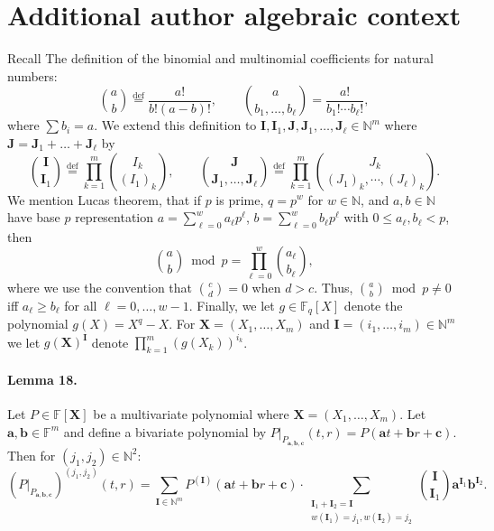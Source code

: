 \section*{Additional author algebraic context}
Recall The definition of the binomial and multinomial coefficients for natural numbers:
\[\binom ab\stackrel{\mathrm{def}}=\frac{a!}{b!(a-b)!},\qquad\binom a{b_1,\ldots,b_\ell}=\frac{a!}{b_1!\cdots b_\ell!},\]
where $\sum b_i=a$. We extend this definition to $\boldsymbol I,\boldsymbol I_1,\boldsymbol J,\boldsymbol J_1,\ldots,\boldsymbol J_\ell\in\mathbb N^m$ where $\boldsymbol J=\boldsymbol J_1+\ldots+\boldsymbol J_\ell$ by
\[\binom{\boldsymbol I}{\boldsymbol I_1}\stackrel{\mathrm{def}}=\prod_{k=1}^m\binom{I_k}{(I_1)_k},\qquad\binom{\boldsymbol J}{\boldsymbol J_1,\ldots,\boldsymbol J_\ell}\stackrel{\mathrm{def}}=\prod_{k=1}^m\binom{J_k}{(J_1)_k,\cdots,(J_\ell)_k}.\]
We mention Lucas theorem, that if $p$ is prime, $q=p^w$ for $w\in\mathbb N$, and $a,b\in\mathbb N$ have base $p$ representation $a=\sum_{\ell=0}^wa_\ell p^\ell$, $b=\sum_{\ell=0}^wb_\ell p^\ell$ with $0\leq a_\ell,b_\ell<p$, then
\[\binom ab\bmod p=\prod_{\ell=0}^w\binom{a_\ell}{b_\ell},\tag{4}\]
where we use the convention that $\binom cd=0$ when $d>c$. Thus, $\binom ab\bmod p\neq0$ iff $a_\ell\geq b_\ell$ for all $\ell=0,\ldots,w-1$.
Finally, we let $g\in\mathbb F_q[X]$ denote the polynomial $g(X)=X^q-X$. For $\boldsymbol X=(X_1,\ldots,X_m)$ and $\boldsymbol I=(i_1,\ldots,i_m)\in\mathbb N^m$ we let $g(\boldsymbol X)^{\boldsymbol I}$ denote $\prod_{k=1}^m(g(X_k))^{i_k}$.
\paragraph{Lemma 18.} Let $P\in\mathbb F[\boldsymbol X]$ be a multivariate polynomial where $\boldsymbol X=(X_1,\ldots,X_m)$. Let $\boldsymbol a,\boldsymbol b\in\mathbb F^m$ and define a bivariate polynomial by $P|_{P_{\boldsymbol a,\boldsymbol b,\boldsymbol c}}(t,r)=P(\boldsymbol at+\boldsymbol br+\boldsymbol c)$. Then for $(j_1,j_2)\in\mathbb N^2$:
\[(P|_{P_{\boldsymbol a,\boldsymbol b,\boldsymbol c}})^{(j_1,j_2)}(t,r)=\sum_{\boldsymbol I\in\mathbb N^m}P^{(\boldsymbol I)}(\boldsymbol at+\boldsymbol br+\boldsymbol c)\cdot\sum_{\substack{\boldsymbol I_1+\boldsymbol I_2=\boldsymbol I\\w(\boldsymbol I_1)=j_1,w(\boldsymbol I_2)=j_2}}\binom{\boldsymbol I}{\boldsymbol I_1}\boldsymbol a^{\boldsymbol I_1}\boldsymbol b^{\boldsymbol I_2}.\]
